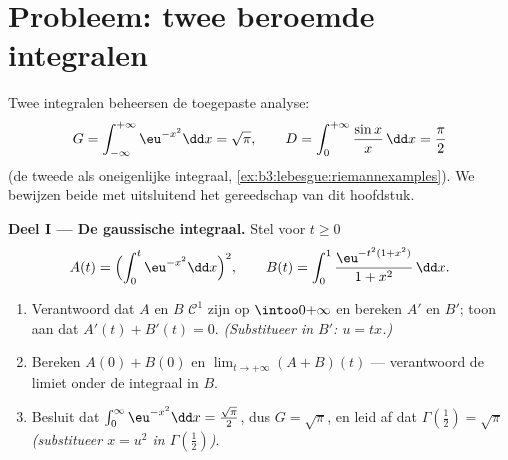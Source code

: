 \section{Probleem: twee beroemde integralen}

\begin{problem}
\label{pb:b3:lebesgue:1}
Twee integralen beheersen de toegepaste analyse:
\[
G = \int_{-\infty}^{+\infty}\eu^{-x^2}\dd x = \sqrt\pi,
\qquad
D = \int_0^{+\infty}\frac{\sin x}{x}\,\dd x = \frac\pi2
\]
(de tweede als oneigenlijke integraal,
\cref{ex:b3:lebesgue:riemannexamples}). We bewijzen beide met
uitsluitend het gereedschap van dit hoofdstuk.

\medskip
\noindent\textbf{Deel I --- De gaussische integraal.} Stel voor $t
\geq 0$
\[
A(t) = \Bigl(\int_0^t\eu^{-x^2}\dd x\Bigr)^{2},
\qquad
B(t) = \int_0^1\frac{\eu^{-t^2(1 + x^2)}}{1 + x^2}\,\dd x .
\]
\begin{enumerate}
  \item Verantwoord dat $A$ en $B$ $\mathcal C^1$ zijn op
        $\intoo0{+\infty}$ en bereken $A'$ en $B'$; toon aan dat
        $A'(t) + B'(t) = 0$. \emph{(Substitueer in $B'$: $u =
        tx$.)}
  \item Bereken $A(0) + B(0)$ en $\lim_{t\to+\infty}(A + B)(t)$
        --- verantwoord de limiet onder de integraal in $B$.
  \item Besluit dat $\int_0^\infty \eu^{-x^2}\dd x =
        \frac{\sqrt\pi}2$, dus $G = \sqrt\pi$, en leid af dat
        $\Gamma(\tfrac12) = \sqrt\pi$ \emph{(substitueer $x = u^2$
        in $\Gamma(\frac12)$)}.
\end{enumerate}


\end{problem}
